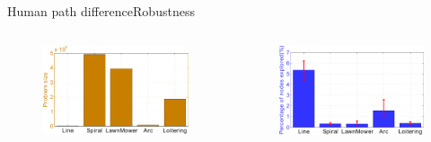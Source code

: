\begin{frame}{Human path difference}{Robustness}

\begin{columns}

\begin{minipage}{\textwidth}
\begin{figure}
\centering
\includegraphics[width=\textwidth]{./figure/ProbSizeInDiffHMP}
\end{figure}
\end{minipage}

\begin{minipage}{\textwidth}
\begin{figure}
\centering
\includegraphics[width=\textwidth]{./figure/ExpRatioInDiffHMP}
\end{figure}
\end{minipage}
\end{columns}


\end{frame}
